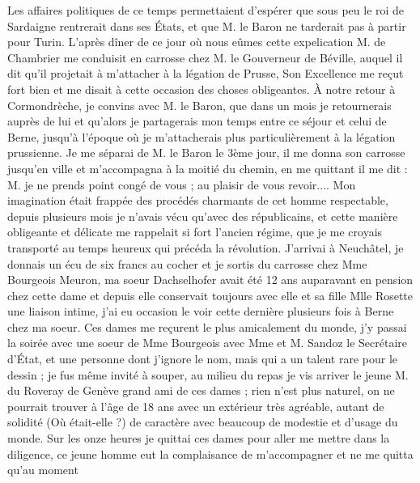 \documentclass[12pt]{article}
\begin{document}
 Les affaires politiques de ce temps
permettaient d’espérer que sous peu le roi de Sardaigne rentrerait dans ses États, et que M. le
Baron ne tarderait pas à partir pour Turin. L’après dîner de ce jour où nous eûmes cette
expelication M. de Chambrier me conduisit en carrosse chez M. le Gouverneur de Béville, auquel il
dit qu’il projetait à m’attacher à la légation de Prusse, Son Excellence me reçut fort bien et me
disait à cette occasion des choses obligeantes. À notre retour à Cormondrèche, je convins avec M. le
Baron, que dans un mois je retournerais auprès de lui et qu’alors je partagerais mon temps entre ce
séjour et celui de Berne, jusqu’à l’époque où je m’attacherais plus particulièrement à la légation
prussienne. Je me séparai de M. le Baron le 3ème jour, il me donna son carrosse jusqu’en ville et
m’accompagna à la moitié du chemin, en me quittant il me dit : M. je ne prends point congé de vous ;
au plaisir de vous revoir.... Mon imagination était frappée des procédés charmants de cet homme
respectable, depuis plusieurs mois je n’avais vécu qu’avec des républicains, et cette manière
obligeante et délicate me rappelait si fort l’ancien régime, que je me croyais transporté au temps
heureux qui précéda la révolution. J’arrivai à Neuchâtel, je donnais un écu de six francs au cocher
et je sortis du carrosse chez Mme Bourgeois Meuron, ma soeur Dachselhofer avait été 12 ans
auparavant en pension chez cette dame et depuis elle conservait toujours avec elle et sa fille Mlle
Rosette une liaison intime, j’ai eu occasion le voir cette dernière plusieurs fois à Berne chez ma
soeur. Ces dames me reçurent le plus amicalement du monde, j’y passai la soirée avec une soeur de
Mme Bourgeois avec Mme et M. Sandoz le Secrétaire d’État, et une personne dont j’ignore le nom, mais
qui a un talent rare pour le dessin ; je fus même invité à souper, au milieu du repas je vis arriver
le jeune M. du Roveray de Genève grand ami de ces dames ; rien n’est plus naturel, on ne pourrait
trouver à l’âge de 18 ans avec un extérieur très agréable, autant de solidité (Où était-elle ?) de
caractère avec beaucoup de modestie et d’usage du monde. Sur les onze heures je quittai ces dames
pour aller me mettre dans la diligence, ce jeune homme eut la complaisance de m’accompagner et ne me
quitta qu’au moment
\end{document}
